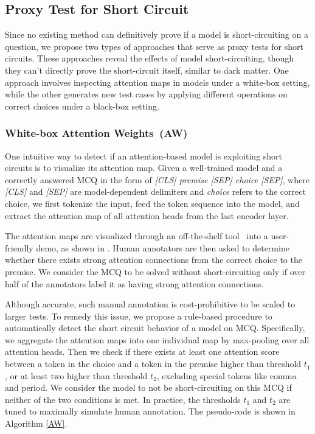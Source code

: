 \subsection{Proxy Test for Short Circuit}
Since no existing method can definitively prove if a model is short-circuiting on a question, we propose two types of approaches that serve as proxy tests for short circuits. These approaches reveal the effects of model short-circuiting, though they can't directly prove the short-circuit itself, similar to dark matter. One approach involves inspecting attention maps in models under a white-box setting, while the other generates new test cases by applying different operations on correct choices under a black-box setting.

\subsubsection*{White-box Attention Weights~(AW)}

One intuitive way to detect if an attention-based model is exploiting short circuits is to visualize its attention map. Given a well-trained model and a correctly answered MCQ in the form of \textit{[CLS] premise [SEP] choice [SEP]}, where \textit{[CLS]} and \textit{[SEP]} are model-dependent delimiters and \textit{choice} refers to the correct choice, we first tokenize the input, feed the token sequence into the model, and extract the attention map of all attention heads from the last encoder layer.

The attention maps are visualized through an off-the-shelf tool~\cite{vig-2019-multiscale} into a user-friendly demo, as shown in . Human annotators are then asked to determine whether there exists strong attention connections from the correct choice to the premise. We consider the MCQ to be solved without short-circuiting only if over half of the annotators label it as having strong attention connections.

Although accurate, such manual annotation is cost-prohibitive to be scaled to larger tests. To remedy this issue, we propose a rule-based procedure to automatically detect the short circuit behavior of a model on MCQ. Specifically, we aggregate the attention maps into one individual map by max-pooling over all attention heads. Then we check if there exists at least one attention score between a token in the choice and a token in the premise higher than threshold $t_1$, or at least two higher than threshold $t_2$, excluding special tokens like comma and period. We consider the model to not be short-circuiting on this MCQ if neither of the two conditions is met. In practice, the thresholds $t_1$ and $t_2$ are tuned to maximally simulate human annotation. The pseudo-code is shown in Algorithm \ref{AW}.


